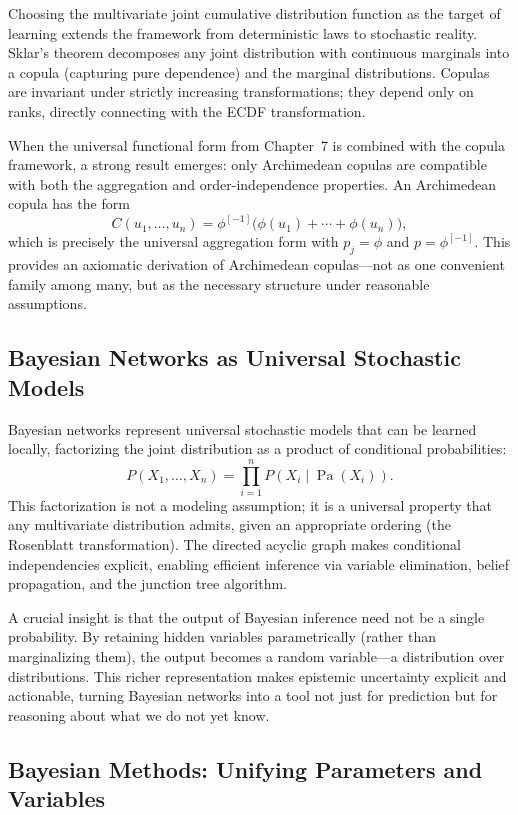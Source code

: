 Choosing the multivariate joint cumulative distribution function as the target of learning extends the framework from deterministic laws to stochastic reality. Sklar's theorem decomposes any joint distribution with continuous marginals into a copula (capturing pure dependence) and the marginal distributions. Copulas are invariant under strictly increasing transformations; they depend only on ranks, directly connecting with the ECDF transformation.

When the universal functional form from Chapter~7 is combined with the copula framework, a strong result emerges: only Archimedean copulas are compatible with both the aggregation and order-independence properties. An Archimedean copula has the form
\[
C(u_1,\dots,u_n) = \phi^{[-1]}\bigl(\phi(u_1)+\cdots+\phi(u_n)\bigr),
\]
which is precisely the universal aggregation form with \(p_j = \phi\) and \(p = \phi^{[-1]}\). This provides an axiomatic derivation of Archimedean copulas—not as one convenient family among many, but as the necessary structure under reasonable assumptions.

\subsection{Bayesian Networks as Universal Stochastic Models}

Bayesian networks represent universal stochastic models that can be learned locally, factorizing the joint distribution as a product of conditional probabilities:
\[
P(X_1,\dots,X_n) = \prod_{i=1}^{n} P(X_i\mid \operatorname{Pa}(X_i)).
\]
This factorization is not a modeling assumption; it is a universal property that any multivariate distribution admits, given an appropriate ordering (the Rosenblatt transformation). The directed acyclic graph makes conditional independencies explicit, enabling efficient inference via variable elimination, belief propagation, and the junction tree algorithm.

A crucial insight is that the output of Bayesian inference need not be a single probability. By retaining hidden variables parametrically (rather than marginalizing them), the output becomes a random variable—a distribution over distributions. This richer representation makes epistemic uncertainty explicit and actionable, turning Bayesian networks into a tool not just for prediction but for reasoning about what we do not yet know.

\subsection{Bayesian Methods: Unifying Parameters and Variables}

